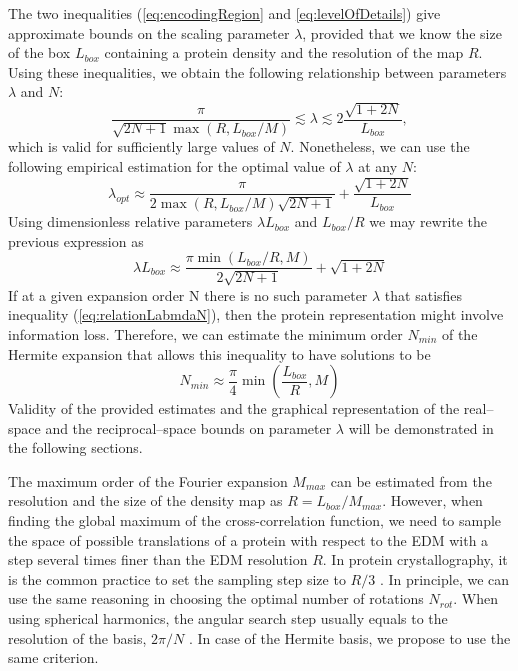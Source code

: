 The two inequalities (\ref{eq:encodingRegion}  and \ref{eq:levelOfDetails})
give approximate bounds on the scaling parameter $\lambda$,
provided that we know the size of the box $L_{box}$ containing a protein density and the resolution of the map $R$. 
Using these inequalities, we obtain the following relationship between parameters $\lambda$ and $N$:
%
\begin{equation}
\frac{\pi}{\sqrt{2N+1}\max(R,L_{box}/M)}\lesssim\lambda\lesssim2\frac{\sqrt{1+2N}}{L_{box}}\label{eq:relationLabmdaN}
,
\end{equation}
which is valid for sufficiently large values of $N$. 
%
Nonetheless, we can use the following empirical estimation for the optimal value of $\lambda$ at any $N$:
\begin{equation}
\lambda_{opt} \approx \frac{\pi}{2\max(R,L_{box}/M)\sqrt{2N+1}}+\frac{\sqrt{1+2N}}{L_{box}}\label{eq:LambdaEstimate}
\end{equation}
%
Using dimensionless relative parameters $\lambda L_{box}$ and $L_{box}/R$ we may rewrite the previous expression as
\begin{equation}
\lambda L_{box} \approx \frac{\pi \min(L_{box}/R,M)}{2\sqrt{2N+1}}+\sqrt{1+2N}\label{RelativeEstimate}
\end{equation}
%
If at a given expansion order N there is no such parameter $\lambda$ that satisfies inequality  (\ref{eq:relationLabmdaN}), then 
the protein representation might involve information loss. Therefore, we can estimate the minimum
order $N_{min}$ of the Hermite expansion that allows this inequality to have solutions to be
\begin{equation}
N_{min} \approx \frac{\pi }{4} \min \left(\frac{L_{box}}{R} , M\right)
\label{eq:Nmin}
\end{equation}
Validity of the provided estimates and the graphical representation of the real--space and the reciprocal--space bounds on parameter $\lambda$
will be demonstrated in the following sections.


The maximum order of the Fourier expansion $M_{max}$ can be estimated from the resolution and the size of the density map as  $R=L_{box} /M_{max}$.
However, when finding the global maximum of the cross-correlation function, we need to sample the space of possible translations of a protein with respect to the EDM with a step several times finer than the EDM resolution $R$.
%
In protein crystallography, it is the common practice to set the 
sampling step size to $R/3$ \cite{afonine2003fast}. 
In principle, we can use the same reasoning in choosing the optimal number of rotations $N_{rot}$. 
When using spherical harmonics, the angular search step usually equals to the resolution of the basis, $2\pi/N$ \cite{garzon2007adp_em}.
In case of the Hermite basis, we propose to use the same criterion.



